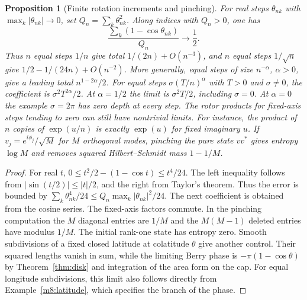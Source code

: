 \documentclass[11pt,reqno]{amsart}
\newtheorem{proposition}[theorem]{Proposition}
\theoremstyle{definition}
\theoremstyle{remark}
\numberwithin{equation}{section}
\begin{document}
\begin{proposition}[Finite rotation increments and pinching]\label{m8:increments}
For real steps $\theta_{nk}$ with
$\max_k|\theta_{nk}|\to0$, set $Q_n=\sum_k\theta_{nk}^2$.
Along indices with $Q_n>0$, one has
\[
 \frac{\sum_k(1-\cos\theta_{nk})}{Q_n}\longrightarrow\frac12 .
\]
Thus $n$ equal steps $1/n$ give total $1/(2n)+O(n^{-3})$,
and $n$ equal steps $1/\sqrt n$ give
$1/2-1/(24n)+O(n^{-2})$. More generally, equal steps of size
$n^{-\alpha}$, $\alpha>0$, give a leading total
$n^{1-2\alpha}/2$. For equal steps $\sigma(T/n)^\alpha$ with
$T>0$ and $\sigma\ne0$, the coefficient is
$\sigma^2T^{2\alpha}/2$. At $\alpha=1/2$ the limit is
$\sigma^2T/2$, including $\sigma=0$. At $\alpha=0$ the example
$\sigma=2\pi$ has zero depth at every step. The rotor products for fixed-axis
steps tending to zero can still have nontrivial limits. For
instance, the product of $n$ copies of $\exp(u/n)$ is exactly
$\exp(u)$ for fixed imaginary $u$.
If $v_j=e^{i\phi_j}/\sqrt M$ for $M$ orthogonal modes, pinching
the pure state $vv^*$ gives entropy $\log M$ and removes
squared Hilbert--Schmidt mass $1-1/M$.
\end{proposition}
\begin{proof}
For real $t$, $0\le t^2/2-(1-\cos t)\le t^4/24$.
The left inequality follows from $|\sin(t/2)|\le|t|/2$,
and the right from Taylor's theorem. Thus the error is bounded
by $\sum_k\theta_{nk}^4/24\le Q_n\max_k|\theta_{nk}|^2/24$.
The next coefficient is obtained from the cosine series. The
fixed-axis factors commute. In the pinching computation the
$M$ diagonal entries are $1/M$ and the $M(M-1)$ deleted entries
have modulus $1/M$. The initial rank-one state has entropy zero.
Smooth subdivisions of a fixed closed latitude at colatitude
$\theta$ give another control. Their squared lengths vanish
in sum, while the limiting Berry phase is
$-\pi(1-\cos\theta)$ by Theorem~\ref{thm:disk} and integration
of the area form on the cap. For equal longitude subdivisions,
this limit also follows directly from
Example~\ref{m8:latitude}, which specifies the branch of the phase.
\end{proof}
\end{document}
